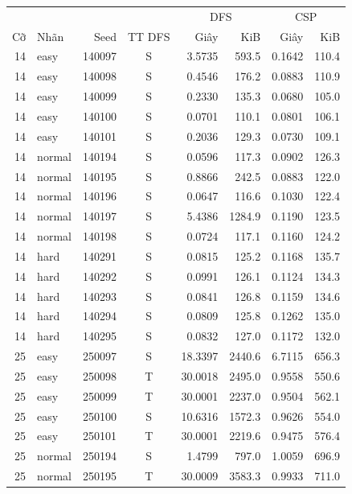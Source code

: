\begin{table}[H]\centering\small
\setlength{\tabcolsep}{4pt}
\begin{tabular*}{\textwidth}{@{\extracolsep{\fill}}rlrcrrrr@{}}\toprule
 & & & & \multicolumn{2}{c}{DFS} & \multicolumn{2}{c}{CSP}\\
Cỡ & Nhãn & Seed & TT DFS & Giây & KiB & Giây & KiB\\\midrule
14 & easy & 140097 & S & 3.5735 & 593.5 & 0.1642 & 110.4\\
14 & easy & 140098 & S & 0.4546 & 176.2 & 0.0883 & 110.9\\
14 & easy & 140099 & S & 0.2330 & 135.3 & 0.0680 & 105.0\\
14 & easy & 140100 & S & 0.0701 & 110.1 & 0.0801 & 106.1\\
14 & easy & 140101 & S & 0.2036 & 129.3 & 0.0730 & 109.1\\
14 & normal & 140194 & S & 0.0596 & 117.3 & 0.0902 & 126.3\\
14 & normal & 140195 & S & 0.8866 & 242.5 & 0.0883 & 122.0\\
14 & normal & 140196 & S & 0.0647 & 116.6 & 0.1030 & 122.4\\
14 & normal & 140197 & S & 5.4386 & 1284.9 & 0.1190 & 123.5\\
14 & normal & 140198 & S & 0.0724 & 117.1 & 0.1160 & 124.2\\
14 & hard & 140291 & S & 0.0815 & 125.2 & 0.1168 & 135.7\\
14 & hard & 140292 & S & 0.0991 & 126.1 & 0.1124 & 134.3\\
14 & hard & 140293 & S & 0.0841 & 126.8 & 0.1159 & 134.6\\
14 & hard & 140294 & S & 0.0809 & 125.8 & 0.1262 & 135.0\\
14 & hard & 140295 & S & 0.0832 & 127.0 & 0.1172 & 132.0\\
25 & easy & 250097 & S & 18.3397 & 2440.6 & 6.7115 & 656.3\\
25 & easy & 250098 & T & 30.0018 & 2495.0 & 0.9558 & 550.6\\
25 & easy & 250099 & T & 30.0001 & 2237.0 & 0.9504 & 562.1\\
25 & easy & 250100 & S & 10.6316 & 1572.3 & 0.9626 & 554.0\\
25 & easy & 250101 & T & 30.0001 & 2219.6 & 0.9475 & 576.4\\
25 & normal & 250194 & S & 1.4799 & 797.0 & 1.0059 & 696.9\\
25 & normal & 250195 & T & 30.0009 & 3583.3 & 0.9933 & 711.0\\

\end{tabular*}
\end{table}
